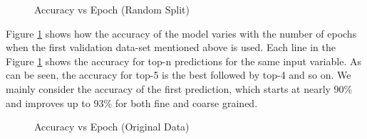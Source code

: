 \begin{figure}[ht]
    \centering
    \caption[Accuracy vs Epoch (Random Split)]{\label{fig:lex_random}Accuracy vs Epoch (Random Split) }
\end{figure}

Figure \ref{fig:lex_random} shows how the accuracy of the model varies with the number of epochs when the first validation data-set mentioned above is used.
Each line in the Figure \ref{fig:lex_random} shows the accuracy for top-n predictions for the same input variable.
As can be seen, the accuracy for top-5 is the best followed by top-4 and so on.
We mainly consider the accuracy of the first prediction, which starts at nearly 90\% and improves up to 93\% for both fine and coarse grained.

\begin{figure}[ht]
    \centering
    \caption[Accuracy vs Epoch (Original Data)]{\label{fig:lex_original}Accuracy vs Epoch (Original Data) }
\end{figure}


